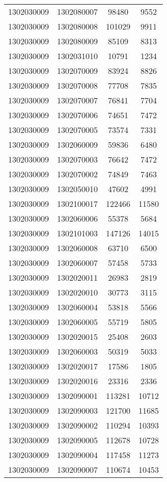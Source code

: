 \begin{longtable}[h]{llcc}
		1302030009 & 1302080007 & 98480 & 9552\\
		1302030009 & 1302080008 & 101029 & 9911\\
		1302030009 & 1302080009 & 85109 & 8313\\
		1302030009 & 1302031010 & 10791 & 1234\\
		1302030009 & 1302070009 & 83924 & 8826\\
		1302030009 & 1302070008 & 77708 & 7835\\
		1302030009 & 1302070007 & 76841 & 7704\\
		1302030009 & 1302070006 & 74651 & 7472\\
		1302030009 & 1302070005 & 73574 & 7331\\
		1302030009 & 1302060009 & 59836 & 6480\\
		1302030009 & 1302070003 & 76642 & 7472\\
		1302030009 & 1302070002 & 74849 & 7463\\
		1302030009 & 1302050010 & 47602 & 4991\\
		1302030009 & 1302100017 & 122466 & 11580\\
		1302030009 & 1302060006 & 55378 & 5684\\
		1302030009 & 1302101003 & 147126 & 14015\\
		1302030009 & 1302060008 & 63710 & 6500\\
		1302030009 & 1302060007 & 57458 & 5733\\
		1302030009 & 1302020011 & 26983 & 2819\\
		1302030009 & 1302020010 & 30773 & 3115\\
		1302030009 & 1302060004 & 53818 & 5566\\
		1302030009 & 1302060005 & 55719 & 5805\\
		1302030009 & 1302020015 & 25408 & 2603\\
		1302030009 & 1302060003 & 50319 & 5033\\
		1302030009 & 1302020017 & 17586 & 1805\\
		1302030009 & 1302020016 & 23316 & 2336\\
		1302030009 & 1302090001 & 113281 & 10712\\
		1302030009 & 1302090003 & 121700 & 11685\\
		1302030009 & 1302090002 & 110294 & 10393\\
		1302030009 & 1302090005 & 112678 & 10728\\
		1302030009 & 1302090004 & 117458 & 11273\\
		1302030009 & 1302090007 & 110674 & 10453\\

\end{longtable}
